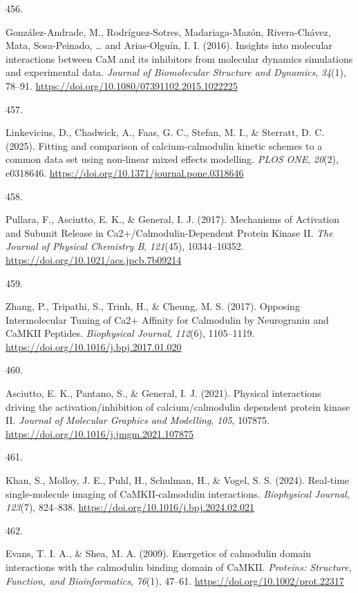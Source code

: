 \documentclass[
  11pt,
  letterpaper,
]{scrreprt}
\newlength{\cslhangindent}
\newlength{\csllabelwidth}
\newenvironment{CSLReferences}[2] %
 {\begin{list}{}{%
  \setlength{\itemindent}{0pt}
  \setlength{\leftmargin}{0pt}
  \setlength{\parsep}{0pt}
  \ifodd #1
   \setlength{\leftmargin}{\cslhangindent}
   \setlength{\itemindent}{-1\cslhangindent}
  \fi
  \setlength{\itemsep}{#2\baselineskip}}}
 {\end{list}}
\newcommand{\CSLLeftMargin}[1]{\parbox[t]{\csllabelwidth}{\strut#1\strut}}
\newcommand{\CSLRightInline}[1]{\parbox[t]{\linewidth - \csllabelwidth}{\strut#1\strut}}
\begin{document}
\begin{CSLReferences}{0}{0}
\CSLLeftMargin{456. }%
\CSLRightInline{González-Andrade, M., Rodríguez-Sotres, Madariaga-Mazón,
Rivera-Chávez, Mata, Sosa-Peinado, \ldots{} and Arias-Olguín, I. I.
(2016). Insights into molecular interactions between {CaM} and its
inhibitors from molecular dynamics simulations and experimental data.
\emph{Journal of Biomolecular Structure and Dynamics}, \emph{34}(1),
78--91. \url{https://doi.org/10.1080/07391102.2015.1022225}}

\CSLLeftMargin{457. }%
\CSLRightInline{Linkevicius, D., Chadwick, A., Faas, G. C., Stefan, M.
I., \& Sterratt, D. C. (2025). Fitting and comparison of
calcium-calmodulin kinetic schemes to a common data set using non-linear
mixed effects modelling. \emph{PLOS ONE}, \emph{20}(2), e0318646.
\url{https://doi.org/10.1371/journal.pone.0318646}}

\CSLLeftMargin{458. }%
\CSLRightInline{Pullara, F., Asciutto, E. K., \& General, I. J. (2017).
Mechanisms of {Activation} and {Subunit Release} in
{Ca2}+/{Calmodulin-Dependent Protein Kinase II}. \emph{The Journal of
Physical Chemistry B}, \emph{121}(45), 10344--10352.
\url{https://doi.org/10.1021/acs.jpcb.7b09214}}

\CSLLeftMargin{459. }%
\CSLRightInline{Zhang, P., Tripathi, S., Trinh, H., \& Cheung, M. S.
(2017). Opposing {Intermolecular Tuning} of {Ca2}+ {Affinity} for
{Calmodulin} by {Neurogranin} and {CaMKII Peptides}. \emph{Biophysical
Journal}, \emph{112}(6), 1105--1119.
\url{https://doi.org/10.1016/j.bpj.2017.01.020}}

\CSLLeftMargin{460. }%
\CSLRightInline{Asciutto, E. K., Pantano, S., \& General, I. J. (2021).
Physical interactions driving the activation/inhibition of
calcium/calmodulin dependent protein kinase {II}. \emph{Journal of
Molecular Graphics and Modelling}, \emph{105}, 107875.
\url{https://doi.org/10.1016/j.jmgm.2021.107875}}

\CSLLeftMargin{461. }%
\CSLRightInline{Khan, S., Molloy, J. E., Puhl, H., Schulman, H., \&
Vogel, S. S. (2024). Real-time single-molecule imaging of
{CaMKII-calmodulin} interactions. \emph{Biophysical Journal},
\emph{123}(7), 824--838.
\url{https://doi.org/10.1016/j.bpj.2024.02.021}}

\CSLLeftMargin{462. }%
\CSLRightInline{Evans, T. I. A., \& Shea, M. A. (2009). Energetics of
calmodulin domain interactions with the calmodulin binding domain of
{CaMKII}. \emph{Proteins: Structure, Function, and Bioinformatics},
\emph{76}(1), 47--61. \url{https://doi.org/10.1002/prot.22317}}


\end{CSLReferences}
\end{document}
